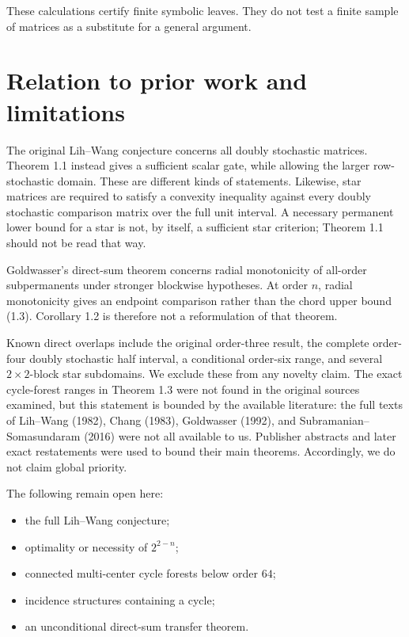 \documentclass[11pt]{article}
\begin{document}
These calculations certify finite symbolic leaves.  They do not test a finite sample
of matrices as a substitute for a general argument.

\section{Relation to prior work and limitations}


The original Lih--Wang conjecture concerns all doubly stochastic matrices.  Theorem
1.1 instead gives a sufficient scalar gate, while allowing the larger row-stochastic
domain.  These are different kinds of statements.  Likewise, star matrices are
required to satisfy a convexity inequality against every doubly stochastic comparison
matrix over the full unit interval.  A necessary permanent lower bound for a star is
not, by itself, a sufficient star criterion; Theorem 1.1 should not be read that way.

Goldwasser's direct-sum theorem concerns radial monotonicity of all-order
subpermanents under stronger blockwise hypotheses.  At order $n$, radial
monotonicity gives an endpoint comparison rather than the chord upper bound (1.3).
Corollary 1.2 is therefore not a reformulation of that theorem.

Known direct overlaps include the original order-three result, the complete
order-four doubly stochastic half interval, a conditional order-six range, and
several $2\times2$-block star subdomains.  We exclude these from any novelty claim.
The exact cycle-forest ranges in Theorem 1.3 were not found in the original sources
examined, but this statement is bounded by the available literature: the full texts
of Lih--Wang (1982), Chang (1983), Goldwasser (1992), and
Subramanian--Somasundaram (2016) were not all available to us.  Publisher
abstracts and later exact restatements were used to bound their main theorems.
Accordingly, we do not claim global priority.

The following remain open here:

\begin{itemize}
\item the full Lih--Wang conjecture;
\item optimality or necessity of $2^{2-n}$;
\item connected multi-center cycle forests below order $64$;
\item incidence structures containing a cycle;
\item an unconditional direct-sum transfer theorem.
\end{itemize}
\end{document}
